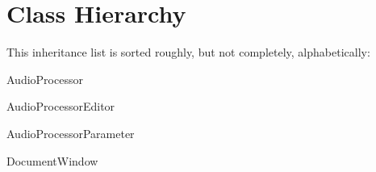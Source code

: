 \section{Class Hierarchy}
This inheritance list is sorted roughly, but not completely, alphabetically\+:\begin{DoxyCompactList}
\item Audio\+Processor\begin{DoxyCompactList}
\item {}
\item {}
\end{DoxyCompactList}
\item Audio\+Processor\+Editor\begin{DoxyCompactList}
\item {}
\end{DoxyCompactList}
\item Audio\+Processor\+Parameter\begin{DoxyCompactList}
\item {}
\end{DoxyCompactList}
\item Document\+Window\begin{DoxyCompactList}
\item {}
\end{DoxyCompactList}
\end{DoxyCompactList}
